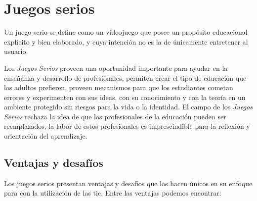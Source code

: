 
\section{Juegos serios}

Un juego serio se define como un videojuego que posee un propósito educacional
explícito y bien elaborado, y cuya intención no es la de únicamente entretener
al usuario\cite{abt1987serious,sg:aoverview,damien:sg}.

Los \emph{Juegos Serios} proveen una oportunidad importante para ayudar en la
enseñanza y desarrollo de profesionales\cite{mariluz:seiousgames}, permiten
crear el tipo de educación que los adultos prefieren, proveen mecanismos para
que los estudiantes cometan errores y experimenten con sus ideas, con su
conocimiento y con la teoría en un ambiente protegido sin riesgos para la vida o
la identidad\cite{sg:aoverview}. El campo de los \emph{Juegos Serios} rechaza la
idea de que los profesionales de la educación pueden ser reemplazados, la labor
de estos profesionales es imprescindible para la reflexión y orientación del
aprendizaje\cite{elearning:seiousgames}.

\subsection{Ventajas y desafíos}

Los juegos serios presentan ventajas y desafíos que los hacen únicos en su
enfoque para con la utilización de las \gls{tic}. Entre las ventajas podemos
encontrar:



